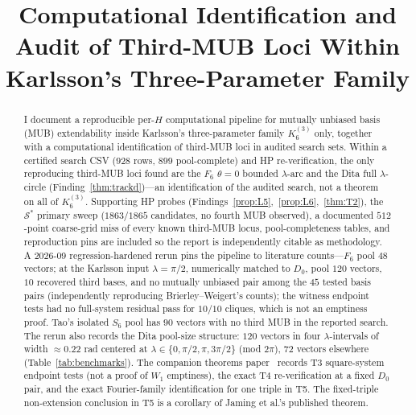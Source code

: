 \documentclass[onecolumn]{IEEEtran}
\begin{document}
\title{Computational Identification and Audit of Third-MUB Loci Within Karlsson's Three-Parameter Family}

\author{%
%
}

\maketitle

\begin{abstract}
I document a reproducible per-$H$ computational pipeline for mutually unbiased basis (MUB) extendability inside Karlsson's three-parameter family $K_6^{(3)}$ only, together with a computational identification of third-MUB loci in audited search sets.
Within a certified search CSV ($928$ rows, $899$ pool-complete) and HP re-verification, the only reproducing third-MUB loci found are the $F_6$ $\theta{=}0$ bounded $\lambda$-arc and the Dita full $\lambda$-circle (Finding~\ref{thm:trackd})---an identification of the audited search, not a theorem on all of $K_6^{(3)}$.
Supporting HP probes (Findings~\ref{prop:L5},~\ref{prop:L6},~\ref{thm:T2}), the $\mathcal{S}^*$ primary sweep ($1863/1865$ candidates, no fourth MUB observed), a documented $512$-point coarse-grid miss of every known third-MUB locus, pool-completeness tables, and reproduction pins are included so the report is independently citable as methodology.
A 2026-09 regression-hardened rerun pins the pipeline to literature counts---$F_6$ pool $48$ vectors; at the Karlsson input $\lambda=\pi/2$, numerically matched to $D_0$, pool $120$ vectors, $10$ recovered third bases, and no mutually unbiased pair among the $45$ tested basis pairs (independently reproducing Brierley--Weigert's counts); the witness endpoint tests had no full-system residual pass for $10/10$ cliques, which is not an emptiness proof. Tao's isolated $S_6$ pool has $90$ vectors with no third MUB in the reported search. The rerun also records the Dita pool-size structure: $120$ vectors in four $\lambda$-intervals of width ${\approx}0.22$ rad centered at $\lambda\in\{0,\pi/2,\pi,3\pi/2\}$ (mod $2\pi$), $72$ vectors elsewhere (Table~\ref{tab:benchmarks}).
The companion theorems paper~\cite{JaupiTheorems2026} records T3 square-system endpoint tests (not a proof of $W_1$ emptiness), the exact T4 re-verification at a fixed $D_0$ pair, and the exact Fourier-family identification for one triple in T5. The fixed-triple non-extension conclusion in T5 is a corollary of Jaming et al.'s published theorem.
\end{abstract}
\end{document}
